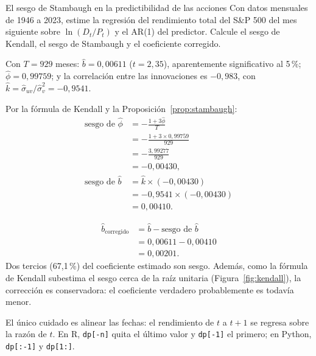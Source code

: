 \begin{ejresuelto}{El sesgo de Stambaugh en la predictibilidad de las acciones}\label{ej:stambaugh}
\enunciado Con datos mensuales de 1946 a 2023, estime la regresión del rendimiento total del S\&P 500 del mes
siguiente sobre $\ln(D_t/P_t)$ y el AR(1) del predictor. Calcule el sesgo de Kendall, el sesgo de Stambaugh y el
coeficiente corregido.

\solucion
{} Con $T=929$ meses: $\hat b=0{,}00611$ ($t=2{,}35$), aparentemente significativo
al 5\,\%; $\hat\phi=0{,}99759$; y la correlación entre las innovaciones es $-0{,}983$, con
$\hat k=\hat\sigma_{uv}/\hat\sigma_v^2=-0{,}9541$.

 Por la fórmula de Kendall y la Proposición~\ref{prop:stambaugh}:
\begin{align*}
  \text{sesgo de }\hat\phi &= -\frac{1+3\hat\phi}{T}\\
                           &= -\frac{1+3\times0{,}99759}{929}\\
                           &= -\frac{3{,}99277}{929}\\
                           &= -0{,}00430,\\
  \text{sesgo de }\hat b   &= \hat k\times(-0{,}00430)\\
                           &= -0{,}9541\times(-0{,}00430)\\
                           &= 0{,}00410 .
\end{align*}

\begin{align*}
  \hat b_{\text{corregido}} &= \hat b-\text{sesgo de }\hat b\\
                            &= 0{,}00611-0{,}00410\\
                            &= 0{,}00201 .
\end{align*}
Dos tercios (67,1\,\%) del coeficiente estimado son sesgo. Además, como la fórmula de Kendall subestima el sesgo
cerca de la raíz unitaria (Figura~\ref{fig:kendall}), la corrección es conservadora: el coeficiente verdadero
probablemente es todavía menor.


\RvsPy El único cuidado es alinear las fechas: el rendimiento de $t$ a $t+1$ se regresa sobre la razón de $t$.
En R, \texttt{dp[-n]} quita el último valor y \texttt{dp[-1]} el primero; en Python, \texttt{dp[:-1]} y
\texttt{dp[1:]}.


\end{ejresuelto}
